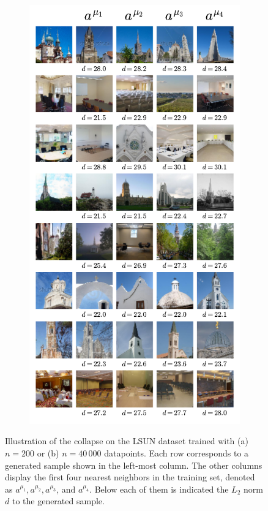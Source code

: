 \documentclass[10pt,twocolumn]{article}
\begin{document}
\begin{figure}[!htb]
\begin{subfigure}{.5\textwidth}
    \includegraphics[width=.9\linewidth]{Figures_SM/Collapse_LSUN_20000.pdf}
    \caption{}
    \label{fig:Collapse_LSUN_40k}
\end{subfigure}
\caption{Illustration of the collapse on the LSUN dataset trained with (a) $n=200$ or (b) $n = 40\,000$ datapoints. Each row corresponds to a generated sample shown in the left-most column. The other columns display the first four nearest neighbors in the training set, denoted as $a^{\mu_1}, a^{\mu_2}, a^{\mu_3}$, and $a^{\mu_4}$. Below each of them is indicated the $L_2$ norm $d$ to the generated sample.}
\label{fig:Collapse_LSUN}
\end{figure}
\end{document}
